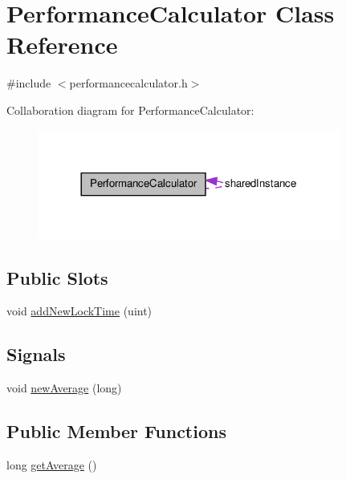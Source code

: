 \hypertarget{class_performance_calculator}{
\section{PerformanceCalculator Class Reference}
\label{class_performance_calculator}
}


{\ttfamily \#include $<$performancecalculator.h$>$}



Collaboration diagram for PerformanceCalculator:\nopagebreak
\begin{figure}[H]
\begin{center}
\leavevmode
\includegraphics[width=281pt]{class_performance_calculator__coll__graph}
\end{center}
\end{figure}
\subsection*{Public Slots}
\begin{DoxyCompactItemize}
\item 
void \hyperlink{class_performance_calculator_a3c53e2b2ac46a779df8b44259796b923}{addNewLockTime} (uint)
\end{DoxyCompactItemize}
\subsection*{Signals}
\begin{DoxyCompactItemize}
\item 
void \hyperlink{class_performance_calculator_ab6c79c61648b5f51aa4b391ba24053e7}{newAverage} (long)
\end{DoxyCompactItemize}
\subsection*{Public Member Functions}
\begin{DoxyCompactItemize}
\item 
long \hyperlink{class_performance_calculator_a01a51ce3574ec960e1c7d59ad59e9095}{getAverage} ()
\end{DoxyCompactItemize}
